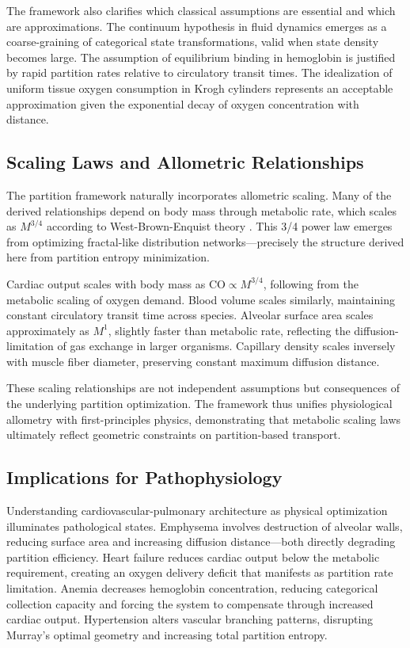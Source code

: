 \documentclass[12pt,a4paper]{article}
\theoremstyle{remark}
\begin{document}
The framework also clarifies which classical assumptions are essential and which are approximations. The continuum hypothesis in fluid dynamics emerges as a coarse-graining of categorical state transformations, valid when state density becomes large. The assumption of equilibrium binding in hemoglobin is justified by rapid partition rates relative to circulatory transit times. The idealization of uniform tissue oxygen consumption in Krogh cylinders represents an acceptable approximation given the exponential decay of oxygen concentration with distance.

\subsection{Scaling Laws and Allometric Relationships}

The partition framework naturally incorporates allometric scaling. Many of the derived relationships depend on body mass through metabolic rate, which scales as $M^{3/4}$ according to West-Brown-Enquist theory \cite{west1997general}. This 3/4 power law emerges from optimizing fractal-like distribution networks—precisely the structure derived here from partition entropy minimization.

Cardiac output scales with body mass as $\mathrm{CO} \propto M^{3/4}$, following from the metabolic scaling of oxygen demand. Blood volume scales similarly, maintaining constant circulatory transit time across species. Alveolar surface area scales approximately as $M^{1}$, slightly faster than metabolic rate, reflecting the diffusion-limitation of gas exchange in larger organisms. Capillary density scales inversely with muscle fiber diameter, preserving constant maximum diffusion distance.

These scaling relationships are not independent assumptions but consequences of the underlying partition optimization. The framework thus unifies physiological allometry with first-principles physics, demonstrating that metabolic scaling laws ultimately reflect geometric constraints on partition-based transport.

\subsection{Implications for Pathophysiology}

Understanding cardiovascular-pulmonary architecture as physical optimization illuminates pathological states. Emphysema involves destruction of alveolar walls, reducing surface area and increasing diffusion distance—both directly degrading partition efficiency. Heart failure reduces cardiac output below the metabolic requirement, creating an oxygen delivery deficit that manifests as partition rate limitation. Anemia decreases hemoglobin concentration, reducing categorical collection capacity and forcing the system to compensate through increased cardiac output. Hypertension alters vascular branching patterns, disrupting Murray's optimal geometry and increasing total partition entropy.
\end{document}
